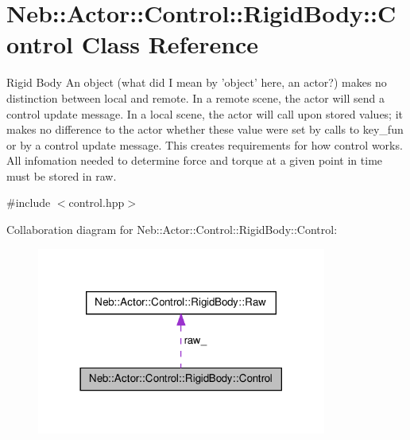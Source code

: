 \hypertarget{classNeb_1_1Actor_1_1Control_1_1RigidBody_1_1Control}{\section{\-Neb\-:\-:\-Actor\-:\-:\-Control\-:\-:\-Rigid\-Body\-:\-:\-Control \-Class \-Reference}
\label{classNeb_1_1Actor_1_1Control_1_1RigidBody_1_1Control}
}


\-Rigid \-Body \-An object (what did \-I mean by 'object' here, an actor?) makes no distinction between local and remote. \-In a remote scene, the actor will send a control update message. \-In a local scene, the actor will call upon stored values; it makes no difference to the actor whether these value were set by calls to key\-\_\-fun or by a control update message. \-This creates requirements for how control works. \-All infomation needed to determine force and torque at a given point in time must be stored in raw.  




{\ttfamily \#include $<$control.\-hpp$>$}



\-Collaboration diagram for \-Neb\-:\-:\-Actor\-:\-:\-Control\-:\-:\-Rigid\-Body\-:\-:\-Control\-:\nopagebreak
\begin{figure}[H]
\begin{center}
\leavevmode
\includegraphics[width=270pt]{classNeb_1_1Actor_1_1Control_1_1RigidBody_1_1Control__coll__graph}
\end{center}
\end{figure}
